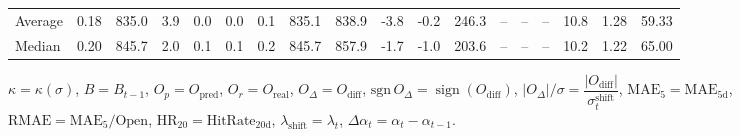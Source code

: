 \begin{threeparttable}
{\begin{tabular}{lrrrrrrrrrrrrrrrrr}
Average &     0.18 & 835.0 &               3.9 &               0.0 &                0.0 &                0.1 & 835.1 & 838.9 &       -3.8 &                     -0.2 &               246.3 &         -- &        -- &             -- &             10.8 &            1.28 &                  59.33 \\
 Median &     0.20 & 845.7 &               2.0 &               0.1 &                0.1 &                0.2 & 845.7 & 857.9 &       -1.7 &                     -1.0 &               203.6 &         -- &        -- &             -- &             10.2 &            1.22 &                  65.00 \\
\bottomrule
\end{tabular}
}
\begin{tablenotes}\footnotesize
\item $\kappa=\kappa(\sigma)$, $B=B_{t-1}$, $O_p=O_{\text{pred}}$, $O_r=O_{\text{real}}$, $O_\Delta=O_{\text{diff}}$, $\mathrm{sgn}\,O_\Delta=\operatorname{sign}(O_{\text{diff}})$, $|O_\Delta|/\sigma=\dfrac{|O_{\text{diff}}|}{\sigma_t^{\text{shift}}}$, $\mathrm{MAE}_5=\mathrm{MAE}_{5\text{d}}$, $\mathrm{RMAE}= \mathrm{MAE}_5 / \text{Open}$, $\mathrm{HR}_{20}=\mathrm{HitRate}_{20\text{d}}$, 
$\lambda_{\text{shift}}=\lambda_t$, 
$\Delta\alpha_t=\alpha_t-\alpha_{t-1}$.
\end{tablenotes}
\end{threeparttable}
\endgroup

